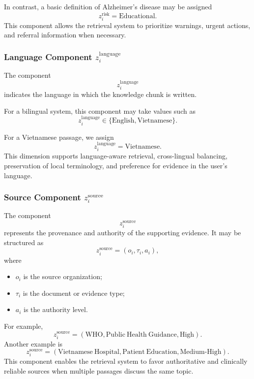 \documentclass{article}
\begin{document}
In contrast, a basic definition of Alzheimer's disease may be assigned
\begin{equation}
    z_i^{\mathrm{risk}} = \mathrm{Educational}.
\end{equation}
This component allows the retrieval system to prioritize warnings, urgent
actions, and referral information when necessary.

\subsubsection{Language Component $z_i^{\mathrm{language}}$}
The component
\begin{equation}
    z_i^{\mathrm{language}}
\end{equation}
indicates the language in which the knowledge chunk is written.

For a bilingual system, this component may take values such as
\begin{equation}
    z_i^{\mathrm{language}}
    \in
    \{
    \mathrm{English},
    \mathrm{Vietnamese}
    \}.
\end{equation}

For a Vietnamese passage, we assign
\begin{equation}
    z_i^{\mathrm{language}} = \mathrm{Vietnamese}.
\end{equation}
This dimension supports language-aware retrieval, cross-lingual balancing,
preservation of local terminology, and preference for evidence in the user's
language.

\subsubsection{Source Component $z_i^{\mathrm{source}}$}
The component
\begin{equation}
    z_i^{\mathrm{source}}
\end{equation}
represents the provenance and authority of the supporting evidence.
It may be structured as
\begin{equation}
    z_i^{\mathrm{source}}
    =
    \left(
    o_i,
    \tau_i,
    a_i
    \right),
\end{equation}
where
\begin{itemize}
    \item $o_i$ is the source organization;
    \item $\tau_i$ is the document or evidence type;
    \item $a_i$ is the authority level.
\end{itemize}
For example,
\begin{equation}
    z_i^{\mathrm{source}}
    =
    \left(
    \mathrm{WHO},
    \mathrm{Public\ Health\ Guidance},
    \mathrm{High}
    \right).
\end{equation}
Another example is
\begin{equation}
    z_i^{\mathrm{source}}
    =
    \left(
    \mathrm{Vietnamese\ Hospital},
    \mathrm{Patient\ Education},
    \mathrm{Medium\text{-}High}
    \right).
\end{equation}
This component enables the retrieval system to favor authoritative and clinically reliable sources when multiple passages discuss the same topic.
\end{document}
